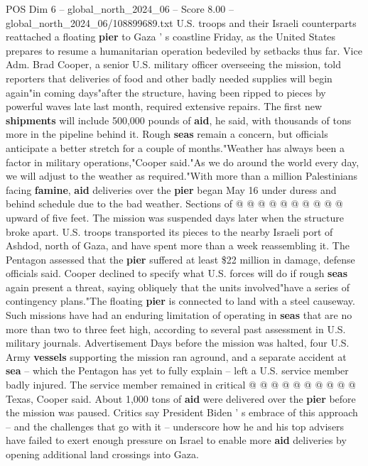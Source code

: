 \begin{textsample}{POS Dim 6 – global\_north\_2024\_06 – Score 8.00 – global\_north\_2024\_06/108899689.txt}  \label{ex:f6_pos_139}
U.S. troops and their Israeli counterparts reattached a floating \textbf{pier} to Gaza ' s coastline Friday, as the United States prepares to resume a humanitarian operation bedeviled by setbacks thus far.
Vice Adm.
Brad Cooper, a senior U.S. military officer overseeing the mission, told reporters that deliveries of food and other badly needed supplies will begin again"in coming days"after the structure, having been ripped to pieces by powerful waves late last month, required extensive repairs.
The first new \textbf{shipments} will include 500,000 pounds of \textbf{aid}, he said, with thousands of tons more in the pipeline behind it.
Rough \textbf{seas} remain a concern, but officials anticipate a better stretch for a couple of months."Weather has always been a factor in military operations,"Cooper said."As we do around the world every day, we will adjust to the weather as required."With more than a million Palestinians facing \textbf{famine}, \textbf{aid} deliveries over the \textbf{pier} began May 16 under duress and behind schedule due to the bad weather.
Sections of @ @ @ @ @ @ @ @ @ @ upward of five feet.
The mission was suspended days later when the structure broke apart.
U.S. troops transported its pieces to the nearby Israeli port of Ashdod, north of Gaza, and have spent more than a week reassembling it.
The Pentagon assessed that the \textbf{pier} suffered at least \$22 million in damage, defense officials said.
Cooper declined to specify what U.S. forces will do if rough \textbf{seas} again present a threat, saying obliquely that the units involved"have a series of contingency plans."The floating \textbf{pier} is connected to land with a steel causeway.
Such missions have had an enduring limitation of operating in \textbf{seas} that are no more than two to three feet high, according to several past assessment in U.S. military journals.
Advertisement Days before the mission was halted, four U.S.
Army \textbf{vessels} supporting the mission ran aground, and a separate accident at \textbf{sea} -- which the Pentagon has yet to fully explain -- left a U.S. service member badly injured.
The service member remained in critical @ @ @ @ @ @ @ @ @ @ Texas, Cooper said.
About 1,000 tons of \textbf{aid} were delivered over the \textbf{pier} before the mission was paused.
Critics say President Biden ' s embrace of this approach -- and the challenges that go with it -- underscore how he and his top advisers have failed to exert enough pressure on Israel to enable more \textbf{aid} deliveries by opening additional land crossings into Gaza.

\end{textsample}
